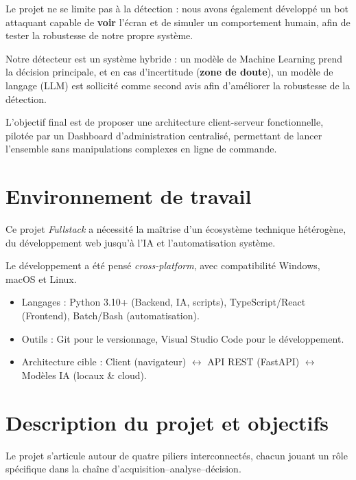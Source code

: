 \documentclass[a4paper, 12pt, twoside]{article}
\begin{document}
Le projet ne se limite pas à la détection : nous avons également développé un bot attaquant capable de \textbf{voir} l'écran et de simuler un comportement humain, afin de tester la robustesse de notre propre système.

Notre détecteur est un système hybride : un modèle de Machine Learning prend la décision principale, et en cas d'incertitude (\textbf{zone de doute}), un modèle de langage (LLM) est sollicité comme second avis afin d'améliorer la robustesse de la détection.

L'objectif final est de proposer une architecture client-serveur fonctionnelle, pilotée par un Dashboard d'administration centralisé, permettant de lancer l'ensemble sans manipulations complexes en ligne de commande.

\section{Environnement de travail}
Ce projet \textit{Fullstack} a nécessité la maîtrise d'un écosystème technique hétérogène, du développement web jusqu'à l'IA et l'automatisation système.

Le développement a été pensé \textit{cross-platform}, avec compatibilité Windows, macOS et Linux.

\begin{itemize}
    \item Langages : Python 3.10+ (Backend, IA, scripts), TypeScript/React (Frontend), Batch/Bash (automatisation).
    \item Outils : Git pour le versionnage, Visual Studio Code pour le développement.
    \item Architecture cible : Client (navigateur) $\leftrightarrow$ API REST (FastAPI) $\leftrightarrow$ Modèles IA (locaux \& cloud).
\end{itemize}

\section{Description du projet et objectifs}
Le projet s'articule autour de quatre piliers interconnectés, chacun jouant un rôle spécifique dans la chaîne d'acquisition--analyse--décision.
\end{document}
